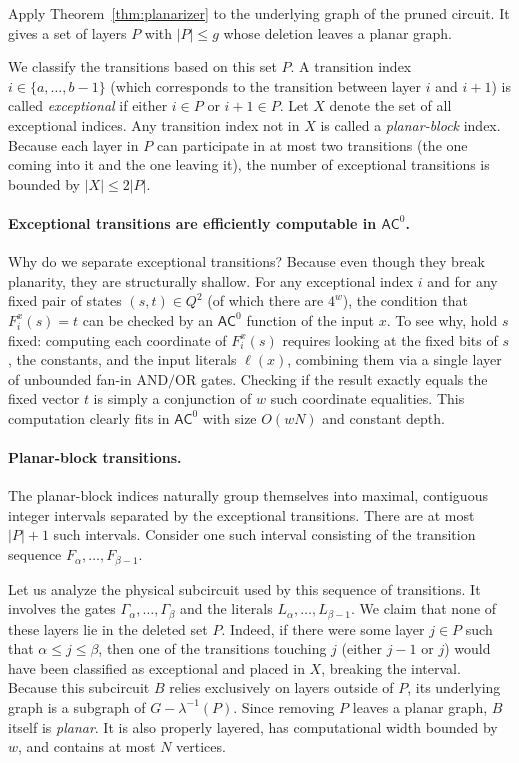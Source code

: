 \documentclass[11pt]{article}
\theoremstyle{definition}
\theoremstyle{remark}
\newcommand{\AC}{\mathsf{AC}^0}
\newcommand{\layer}{\lambda}
\begin{document}
Apply Theorem~\ref{thm:planarizer} to the underlying graph of the pruned circuit.
It gives a set of layers $P$ with $|P|\le g$ whose deletion leaves a planar graph.

We classify the transitions based on this set $P$. A transition index $i\in\{a,\dots,b-1\}$ (which corresponds to the transition between layer $i$ and $i+1$) is called \emph{exceptional} if either $i\in P$ or $i+1\in P$. Let $X$ denote the set of all exceptional indices. Any transition index not in $X$ is called a \emph{planar-block} index. Because each layer in $P$ can participate in at most two transitions (the one coming into it and the one leaving it), the number of exceptional transitions is bounded by $|X|\le 2|P|$.

\paragraph{Exceptional transitions are efficiently computable in $\AC$.}
Why do we separate exceptional transitions? Because even though they break planarity, they are structurally shallow. For any exceptional index $i$ and for any fixed pair of states $(s,t)\in Q^2$ (of which there are $4^w$), the condition that $F^x_i(s)=t$ can be checked by an $\AC$ function of the input $x$. To see why, hold $s$ fixed: computing each coordinate of $F^x_i(s)$ requires looking at the fixed bits of $s$, the constants, and the input literals $\ell(x)$, combining them via a single layer of unbounded fan-in $\mathrm{AND}/\mathrm{OR}$ gates. Checking if the result exactly equals the fixed vector $t$ is simply a conjunction of $w$ such coordinate equalities. This computation clearly fits in $\AC$ with size $O(wN)$ and constant depth.

\paragraph{Planar-block transitions.}
The planar-block indices naturally group themselves into maximal, contiguous integer intervals separated by the exceptional transitions. There are at most $|P|+1$ such intervals. Consider one such interval consisting of the transition sequence $F_{\alpha},\dots,F_{\beta-1}$.

Let us analyze the physical subcircuit used by this sequence of transitions. It involves the gates $\Gamma_{\alpha},\dots,\Gamma_{\beta}$ and the literals $L_{\alpha},\dots,L_{\beta-1}$. We claim that none of these layers lie in the deleted set $P$. Indeed, if there were some layer $j\in P$ such that $\alpha\le j\le\beta$, then one of the transitions touching $j$ (either $j-1$ or $j$) would have been classified as exceptional and placed in $X$, breaking the interval. Because this subcircuit $B$ relies exclusively on layers outside of $P$, its underlying graph is a subgraph of $G-\layer^{-1}(P)$. Since removing $P$ leaves a planar graph, $B$ itself is \emph{planar}. It is also properly layered, has computational width bounded by $w$, and contains at most $N$ vertices.
\end{document}
